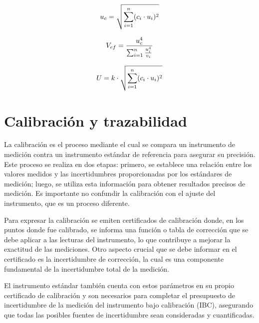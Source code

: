 \begin{equation}
    \centering
    u_c = \sqrt{\sum_{i=1}^{n} (c_i \cdot u_i)^2}
    \label{eq:incertidumbreCombinadaGral}
\end{equation}

\begin{equation}
    \centering
    V_{ef} = \frac{u_c^4}{\sum_{i=1}^{n} \frac{u_i^4}{v_i}}
    \label{eq:gradosDelibertadEfectivos}
\end{equation}



\begin{equation}
    \centering
    U = k \cdot \sqrt{\sum_{i=1}^{n} (c_i \cdot u_i)^2}
    \label{eq:incertidumbreExpandida}
\end{equation}

\section{Calibración y trazabilidad}\label{sec:trazabilidad}

La calibración es el proceso mediante el cual se compara un instrumento de medición contra un instrumento estándar de referencia para asegurar su precisión. Este proceso se realiza en dos etapas: primero, se establece una relación entre los valores medidos y las incertidumbres proporcionadas por los estándares de medición; luego, se utiliza esta información para obtener resultados precisos de medición. Es importante no confundir la calibración con el ajuste del instrumento, que es un proceso diferente.

Para expresar la calibración se emiten certificados de calibración donde, en los puntos donde fue calibrado, se informa una función o tabla de corrección que se debe aplicar a las lecturas del instrumento,  lo que contribuye a mejorar la exactitud de las mediciones. Otro aspecto crucial que se debe informar en el certificado es la incertidumbre de corrección, la cual es una componente fundamental de la incertidumbre total de la medición.

El instrumento estándar también cuenta con estos parámetros en su propio certificado de calibración y son necesarios para completar el presupuesto de incertidumbre de la medición del instrumento bajo calibración (IBC), asegurando que todas las posibles fuentes de incertidumbre sean consideradas y cuantificadas.


